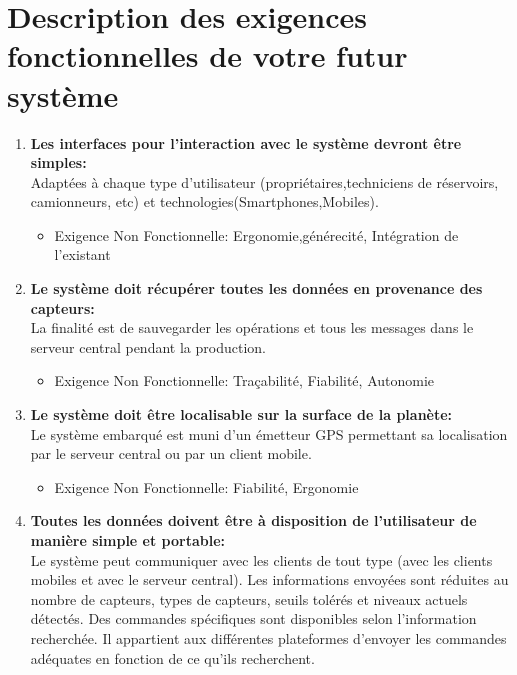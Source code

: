 \section{Description des exigences fonctionnelles de votre futur système}
\begin{enumerate}

\item  \textbf{Les interfaces pour l'interaction avec le système devront être simples:}\\
Adaptées à chaque type d'utilisateur (propriétaires,techniciens de réservoirs, camionneurs, etc) et technologies(Smartphones,Mobiles).
\begin{itemize}

\item Exigence Non Fonctionnelle: Ergonomie,générecité, Intégration de l'existant
\end{itemize}
\item  \textbf{Le système doit récupérer toutes les données en provenance des capteurs:}\\
La finalité est de sauvegarder les opérations et tous les messages dans le serveur central pendant la production.
\begin{itemize}

\item Exigence Non Fonctionnelle: Traçabilité, Fiabilité, Autonomie
\end{itemize}
\item  \textbf{Le système doit être localisable sur la surface de la planète:}\\
Le système embarqué est muni d'un émetteur GPS permettant sa localisation par le serveur central ou par un client mobile.
\begin{itemize}

\item Exigence Non Fonctionnelle: Fiabilité, Ergonomie
\end{itemize}
\item  \textbf{Toutes les données doivent être à disposition de l'utilisateur de manière simple et portable:}\\
Le système peut communiquer avec les clients de tout type (avec les clients mobiles et avec le serveur central). 
Les informations envoyées sont réduites au nombre de capteurs, types de capteurs, 
seuils tolérés et niveaux actuels détectés. Des commandes spécifiques sont disponibles selon l'information recherchée. 
Il appartient aux différentes plateformes d'envoyer les commandes adéquates en fonction de ce qu'ils recherchent.
\begin{itemize}


\end{itemize}
\end{enumerate}
